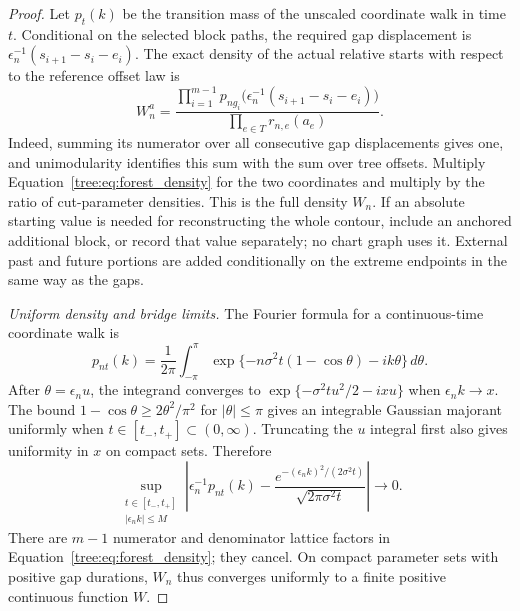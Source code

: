 \begin{proof}
Let $p_t(k)$ be the transition mass of the unscaled coordinate walk
in time $t$.  Conditional on the selected block paths, the required
gap displacement is
$\epsilon_n^{-1}(s_{i+1}-s_i-e_i)$.  The exact density of the actual
relative starts with respect to the reference offset law is
\begin{equation}\label{tree:eq:forest_density}
 W_n^{a}=
 \frac{\displaystyle\prod_{i=1}^{m-1}
   p_{ng_i}\bigl(\epsilon_n^{-1}(s_{i+1}-s_i-e_i)\bigr)}
 {\displaystyle\prod_{e\in T}r_{n,e}(a_e)}.
\end{equation}
Indeed, summing its numerator over all consecutive gap displacements
gives one, and unimodularity identifies this sum with the sum over
tree offsets.  Multiply Equation~\eqref{tree:eq:forest_density} for the
two coordinates and multiply by the ratio of cut-parameter densities.
This is the full density $W_n$.  If an absolute starting value is
needed for reconstructing the whole contour, include an anchored
additional block, or record that value separately; no chart graph
uses it.  External past and future portions are added conditionally
on the extreme endpoints in the same way as the gaps.

\emph{Uniform density and bridge limits.}
The Fourier formula for a continuous-time coordinate walk is
\begin{equation}\label{tree:eq:poisson_walk_fourier}
 p_{nt}(k)=\frac1{2\pi}\int_{-\pi}^{\pi}
 \exp\{-n\sigma^2t(1-\cos\theta)-ik\theta\}\,d\theta.
\end{equation}
After $\theta=\epsilon_n u$, the integrand converges to
$\exp\{-\sigma^2tu^2/2-ixu\}$ when
$\epsilon_n k\to x$.  The bound
$1-\cos\theta\geq2\theta^2/\pi^2$ for $|\theta|\leq\pi$
gives an integrable Gaussian majorant uniformly when
$t\in[t_-,t_+]\subset(0,\infty)$.  Truncating the $u$ integral
first also gives uniformity in $x$ on compact sets.  Therefore
\begin{equation}\label{tree:eq:uniform_gap_lclt}
 \sup_{\substack{t\in[t_-,t_+]\\ |\epsilon_n k|\leq M}}
 \left|\epsilon_n^{-1}p_{nt}(k)-
 \frac{e^{-(\epsilon_n k)^2/(2\sigma^2t)}}
 {\sqrt{2\pi\sigma^2t}}\right|\longrightarrow0.
\end{equation}
There are $m-1$ numerator and denominator lattice factors in
Equation~\eqref{tree:eq:forest_density}; they cancel.  On compact parameter
sets with positive gap durations, $W_n$ thus converges uniformly to
a finite positive continuous function $W$.


\end{proof}
